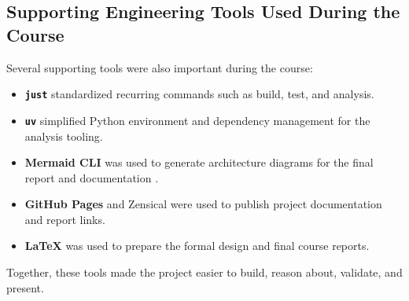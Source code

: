 \subsection{Supporting Engineering Tools Used During the Course}

Several supporting tools were also important during the course:

\begin{itemize}[nosep]
  \item \textbf{\texttt{just}} standardized recurring commands such as build, test, and
    analysis.
  \item \textbf{\texttt{uv}} simplified Python environment and dependency management for the
    analysis tooling.
  \item \textbf{Mermaid CLI} was used to generate architecture diagrams for the final report and
    documentation \cite{mermaid}.
  \item \textbf{GitHub Pages} and Zensical were used to publish project documentation and report
    links.
  \item \textbf{LaTeX} was used to prepare the formal design and final course reports.
\end{itemize}

Together, these tools made the project easier to build, reason about, validate, and present.
